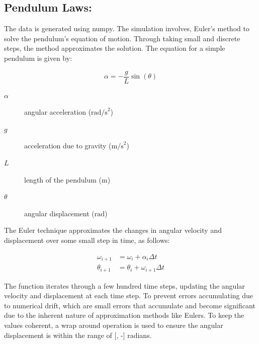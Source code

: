 \documentclass{article}
\begin{document}
\subsection{Pendulum Laws:}

The data is generated using numpy. The simulation involves, Euler's method to solve the pendulum's equation of motion. Through taking small and discrete steps, the method approximates the solution. The equation for a simple pendulum is given by: \\



\begin{center}
\begin{equation}
\alpha = -\frac{g}{L} \sin(\theta)
\end{equation}
\end{center}

\begin{description}
    \item[\(\alpha\)] angular acceleration (\(\text{rad/s}^2\))
    \item[\(g\)] acceleration due to gravity (\(\text{m/s}^2\))
    \item[\(L\)] length of the pendulum (\(\text{m}\))
    \item[\(\theta\)] angular displacement (\(\text{rad}\))
\end{description}

The Euler technique approximates the changes in angular velocity and displacement over some small step in time, as follows:\\

\begin{center}
\begin{align} 
\omega_{i+1} &= \omega_i + \alpha_i \Delta t \\
\theta_{i+1} &= \theta_i + \omega_{i+1} \Delta t 
\end{align}
\end{center}


The function iterates through a few hundred time steps, updating the angular velocity and displacement at each time step. To prevent errors accumulating due to numerical drift, which are small errors that accumulate and become significant due to the inherent nature of approximation methods like Eulers. To keep the values coherent, a wrap around operation is used to ensure the angular displacement is within the range of [\pi, -\pi] radians.\\ 
\end{document}
